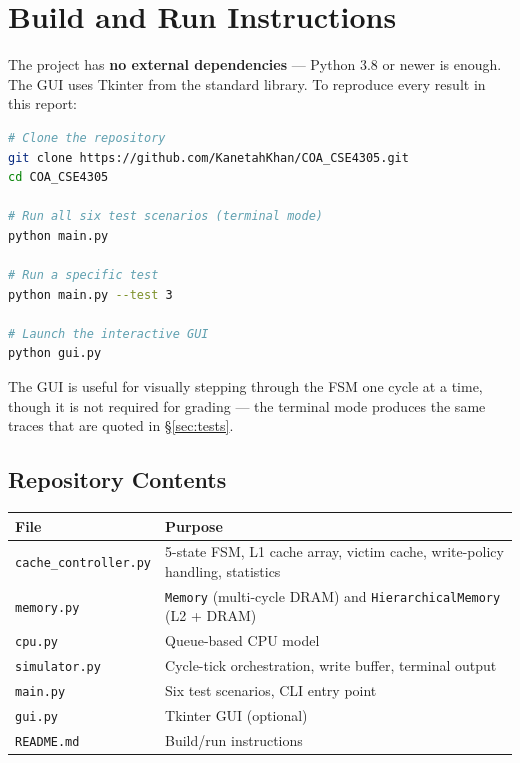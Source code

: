 \documentclass[11pt,a4paper]{article}
\begin{document}
\section{Build and Run Instructions}\label{sec:build}

The project has \textbf{no external dependencies} — Python 3.8 or newer is
enough. The GUI uses Tkinter from the standard library. To reproduce every
result in this report:

\begin{lstlisting}[language=bash]
# Clone the repository
git clone https://github.com/KanetahKhan/COA_CSE4305.git
cd COA_CSE4305

# Run all six test scenarios (terminal mode)
python main.py

# Run a specific test
python main.py --test 3

# Launch the interactive GUI
python gui.py
\end{lstlisting}

The GUI is useful for visually stepping through the FSM one cycle at a time,
though it is not required for grading — the terminal mode produces the same
traces that are quoted in \S\ref{sec:tests}.

\subsection{Repository Contents}

\begin{table}[h]
    \centering
    \begin{tabular}{@{}lp{8cm}@{}}
        \toprule
        \textbf{File} & \textbf{Purpose} \\
        \midrule
        \texttt{cache\_controller.py} & 5-state FSM, L1 cache array, victim cache, write-policy handling, statistics \\
        \texttt{memory.py}            & \texttt{Memory} (multi-cycle DRAM) and \texttt{HierarchicalMemory} (L2 + DRAM) \\
        \texttt{cpu.py}               & Queue-based CPU model \\
        \texttt{simulator.py}         & Cycle-tick orchestration, write buffer, terminal output \\
        \texttt{main.py}              & Six test scenarios, CLI entry point \\
        \texttt{gui.py}               & Tkinter GUI (optional) \\
        \texttt{README.md}            & Build/run instructions \\
        \bottomrule
    \end{tabular}
\end{table}
\end{document}
